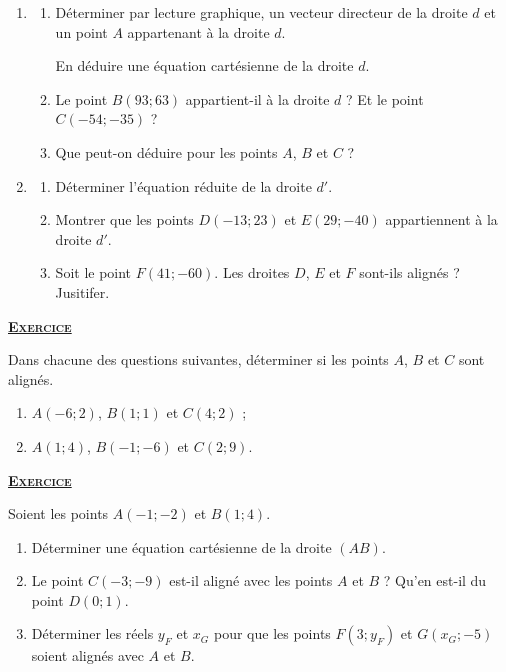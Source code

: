 \begin{enumerate}
\def\labelenumi{\arabic{enumi}.}
\item
  \begin{enumerate}
  \def\labelenumii{(\alph{enumii})}
  \tightlist
  \item
    Déterminer par lecture graphique, un vecteur directeur de la droite
    \(d\) et un point \(A\) appartenant à la droite \(d\).

    \par

    En déduire une équation cartésienne de la droite \(d\).
  \item
    Le point \(B(93;63)\) appartient-il à la droite \(d\) ? Et le point
    \(C(-54;-35)\) ?
  \item
    Que peut-on déduire pour les points \(A\), \(B\) et \(C\) ?
  \end{enumerate}
\item
  \begin{enumerate}
  \def\labelenumii{(\alph{enumii})}
  \tightlist
  \item
    Déterminer l'équation réduite de la droite \(d'\).
  \item
    Montrer que les points \(D(-13;23)\) et \(E(29;-40)\) appartiennent
    à la droite \(d'\).
  \item
    Soit le point \(F(41;-60)\). Les droites \(D\), \(E\) et \(F\)
    sont-ils alignés ? Jusitifer.
  \end{enumerate}
\end{enumerate}

\medskip

 \underline{\textsc{\textbf{Exercice }}}

Dans chacune des questions suivantes, déterminer si les points \(A\),
\(B\) et \(C\) sont alignés.

\begin{enumerate}
\def\labelenumi{\alph{enumi}.}
\tightlist
\item
  \(A(-6;2)\), \(B(1;1)\) et \(C(4;2)\) ;
\item
  \(A(1;4)\), \(B(-1;-6)\) et \(C(2;9)\).
\end{enumerate}

\medskip

 \underline{\textsc{\textbf{Exercice }}}

Soient les points \(A(-1;-2)\) et \(B(1;4)\).

\begin{enumerate}
\def\labelenumi{\arabic{enumi}.}
\tightlist
\item
  Déterminer une équation cartésienne de la droite \((AB)\).
\item
  Le point \(C(-3;-9)\) est-il aligné avec les points \(A\) et \(B\) ?
  Qu'en est-il du point \(D(0;1)\).
\item
  Déterminer les réels \(y_F\) et \(x_G\) pour que les points
  \(F(3;y_F)\) et \(G(x_G;-5)\) soient alignés avec \(A\) et \(B\).
\end{enumerate}

